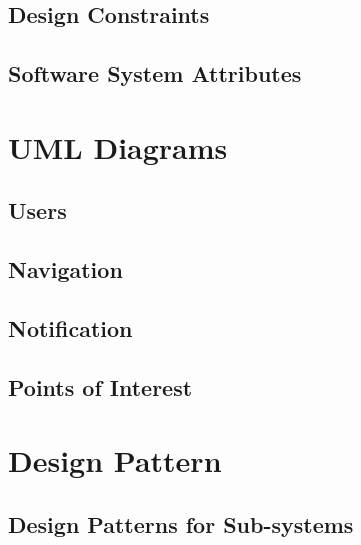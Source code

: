 \documentclass{article}
\begin{document}
	\subsection{Design Constraints}
	
	\subsection{Software System Attributes}

\section{UML Diagrams}
	\subsection{Users}
	
	\subsection{Navigation}
	
	\subsection{Notification}
	
	\subsection{Points of Interest}

\section{Design Pattern}
	\subsection{Design Patterns for Sub-systems}
	
\end{document}
